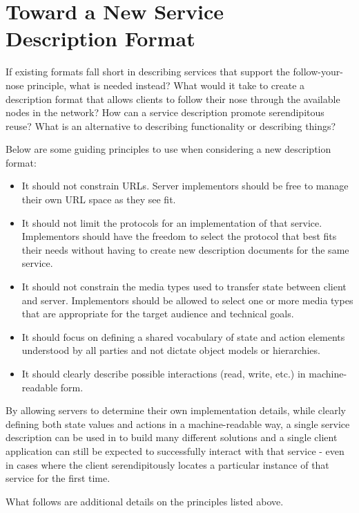 \documentclass{wsrest2014}
\begin{document}
\section{Toward a New Service\\Description Format}
\label{_toward_a_new_service_description_format}
 \par{}If existing formats fall short in describing services that support the follow-your-nose principle, what is needed instead? What would it take to create a description format that allows clients to follow their nose through the available nodes in the network? How can a service description promote serendipitous reuse? What is an alternative to describing functionality or describing things?
 \par{}Below are some guiding principles to use when considering a new description format:
  \begin{itemize}
\item%
It should not constrain URLs. Server implementors should be free to manage their own URL space as they see fit.

\item%
It should not limit the protocols for an implementation of that service. Implementors should have the freedom to select the protocol that best fits their needs without having to create new description documents for the same service.

\item%
It should not constrain the media types used to transfer state between client and server. Implementors should be allowed to select one or more media types that are appropriate for the target audience and technical goals.

\item%
It should focus on defining a shared vocabulary of state and action elements understood by all parties and not dictate object models or hierarchies.

\item%
It should clearly describe possible interactions (read, write, etc.) in machine-readable form.

\end{itemize}
 \par{}By allowing servers to determine their own implementation details, while clearly defining both state values and actions in a machine-readable way, a single service description can be used in to build many different solutions and a single client application can still be expected to successfully interact with that service - even in cases where the client serendipitously locates a particular instance of that service for the first time.
 \par{}What follows are additional details on the principles listed above.
\hypertarget{_describe_affordances}{}
\end{document}
